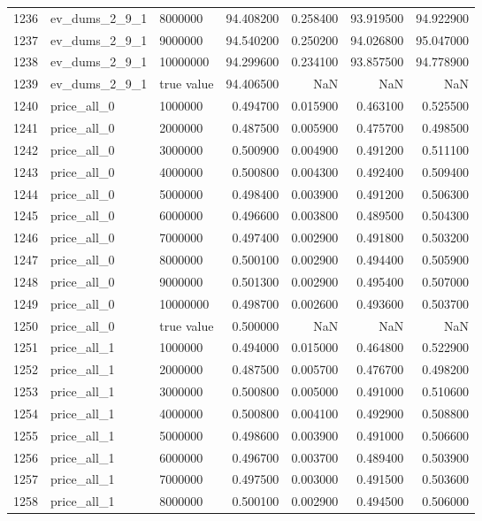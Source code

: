 \begin{tabular}{lllrrrr}
1236 & ev_dums_2_9_1 & 8000000 & 94.408200 & 0.258400 & 93.919500 & 94.922900 \\
1237 & ev_dums_2_9_1 & 9000000 & 94.540200 & 0.250200 & 94.026800 & 95.047000 \\
1238 & ev_dums_2_9_1 & 10000000 & 94.299600 & 0.234100 & 93.857500 & 94.778900 \\
1239 & ev_dums_2_9_1 & true value & 94.406500 & NaN & NaN & NaN \\
1240 & price_all_0 & 1000000 & 0.494700 & 0.015900 & 0.463100 & 0.525500 \\
1241 & price_all_0 & 2000000 & 0.487500 & 0.005900 & 0.475700 & 0.498500 \\
1242 & price_all_0 & 3000000 & 0.500900 & 0.004900 & 0.491200 & 0.511100 \\
1243 & price_all_0 & 4000000 & 0.500800 & 0.004300 & 0.492400 & 0.509400 \\
1244 & price_all_0 & 5000000 & 0.498400 & 0.003900 & 0.491200 & 0.506300 \\
1245 & price_all_0 & 6000000 & 0.496600 & 0.003800 & 0.489500 & 0.504300 \\
1246 & price_all_0 & 7000000 & 0.497400 & 0.002900 & 0.491800 & 0.503200 \\
1247 & price_all_0 & 8000000 & 0.500100 & 0.002900 & 0.494400 & 0.505900 \\
1248 & price_all_0 & 9000000 & 0.501300 & 0.002900 & 0.495400 & 0.507000 \\
1249 & price_all_0 & 10000000 & 0.498700 & 0.002600 & 0.493600 & 0.503700 \\
1250 & price_all_0 & true value & 0.500000 & NaN & NaN & NaN \\
1251 & price_all_1 & 1000000 & 0.494000 & 0.015000 & 0.464800 & 0.522900 \\
1252 & price_all_1 & 2000000 & 0.487500 & 0.005700 & 0.476700 & 0.498200 \\
1253 & price_all_1 & 3000000 & 0.500800 & 0.005000 & 0.491000 & 0.510600 \\
1254 & price_all_1 & 4000000 & 0.500800 & 0.004100 & 0.492900 & 0.508800 \\
1255 & price_all_1 & 5000000 & 0.498600 & 0.003900 & 0.491000 & 0.506600 \\
1256 & price_all_1 & 6000000 & 0.496700 & 0.003700 & 0.489400 & 0.503900 \\
1257 & price_all_1 & 7000000 & 0.497500 & 0.003000 & 0.491500 & 0.503600 \\
1258 & price_all_1 & 8000000 & 0.500100 & 0.002900 & 0.494500 & 0.506000 \\

\end{tabular}
